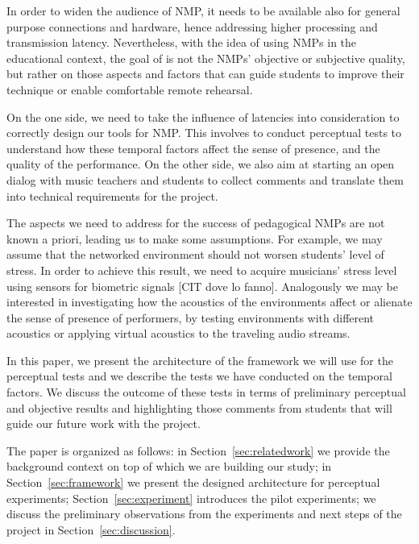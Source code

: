 In order to widen the audience of NMP, it needs to be available also for general purpose connections and hardware, hence addressing higher processing and transmission latency. Nevertheless, with the idea of using NMPs in the educational context, the goal of is not the NMPs' objective or subjective quality, but rather on those aspects and factors that can guide students to improve their technique or enable comfortable remote rehearsal. 

On the one side, we need to take the influence of latencies into consideration to correctly design our tools for NMP. This involves to conduct perceptual tests to understand how these temporal factors affect the sense of presence, and the quality of the performance. On the other side, we also aim at starting an open dialog with music teachers and students to collect comments and translate them into technical requirements for the project. 

The aspects we need to address for the success of pedagogical NMPs are not known a priori, leading us to make some assumptions. For example, we may assume that the networked environment should not worsen students' level of stress. In order to achieve this result, we need to acquire musicians' stress level using sensors for biometric signals [CIT dove lo fanno]. Analogously we may be interested in investigating how the acoustics of the environments affect or alienate the sense of presence of performers, by testing environments with different acoustics or applying virtual acoustics to the traveling audio streams.

In this paper, we present the architecture of the framework we will use for the perceptual tests and we describe the tests we have conducted on the temporal factors. We discuss the outcome of these tests in terms of preliminary perceptual and objective results and highlighting those comments from students that will guide our future work with the project.

The paper is organized as follows: in Section~\ref{sec:relatedwork} we provide the background context on top of which we are building our study; in Section~\ref{sec:framework} we present the designed architecture for perceptual experiments; Section~\ref{sec:experiment} introduces the pilot experiments; we discuss the preliminary observations from the experiments and next steps of the project in Section~\ref{sec:discussion}.

